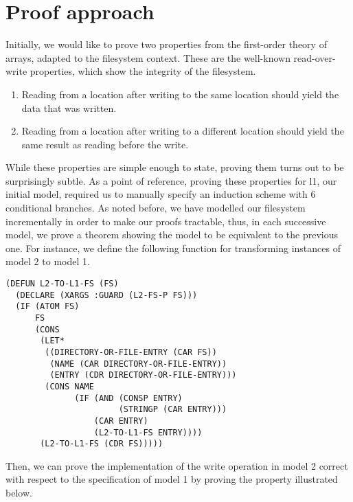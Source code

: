 \documentclass[format=sigconf,review=true]{acmart}
\begin{document}
\section {Proof approach}

Initially, we would like to prove two properties from the
first-order theory of arrays, adapted to the filesystem context. These
are the well-known read-over-write properties, which show the
integrity of the filesystem.

\begin {enumerate}
\item Reading from a location after writing to the same location
  should yield the data that was written.
\item Reading from a location after writing to a different
  location should yield the same result as reading before the write.
\end {enumerate}

While these properties are simple enough to state, proving them turns
out to be surprisingly subtle. As a point of reference, proving these
properties for l1, our initial model, required us to manually specify
an induction scheme with 6 conditional branches. As noted
before, we have modelled our filesystem incrementally in order to make
our proofs tractable, thus, in each successive model, we prove a
theorem showing the model to be equivalent to the previous one. For
instance, we define the following function for transforming
instances of model 2 to model 1.

\begin{lstlisting}
(DEFUN L2-TO-L1-FS (FS)
  (DECLARE (XARGS :GUARD (L2-FS-P FS)))
  (IF (ATOM FS)
      FS
      (CONS
       (LET*
        ((DIRECTORY-OR-FILE-ENTRY (CAR FS))
         (NAME (CAR DIRECTORY-OR-FILE-ENTRY))
         (ENTRY (CDR DIRECTORY-OR-FILE-ENTRY)))
        (CONS NAME
              (IF (AND (CONSP ENTRY)
                       (STRINGP (CAR ENTRY)))
                  (CAR ENTRY)
                  (L2-TO-L1-FS ENTRY))))
       (L2-TO-L1-FS (CDR FS)))))
\end{lstlisting}

Then, we can prove the implementation of the write operation in model
2 correct with respect to the specification of model 1 by proving the
property illustrated below.

\end{document}
